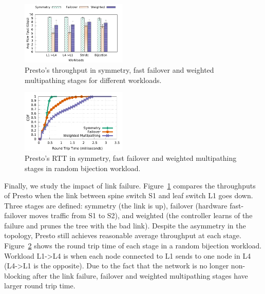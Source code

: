 
\begin{figure}[t]
        \centering
  \includegraphics[width=0.45\textwidth]{./figures/failure_handling/failover_compare_tput_witherrbar.pdf}
        \caption{Presto's throughput in symmetry, fast failover and weighted multipathing stages for different workloads.}
        \label{failover_compare_tput}
\end{figure}

\begin{figure}[t]
        \centering
  \includegraphics[width=0.45\textwidth]{./figures/failure_handling/failover_compare_sockperf_bijection_mice.pdf}
        \caption{Presto's RTT in symmetry, fast failover and weighted multipathing stages in  random bijection workload.}
        \label{failover_compare_sockperf_bijection}
\end{figure}

Finally, we study the impact of link failure.
Figure~\ref{failover_compare_tput} compares the throughputs of
Presto when %
the link between spine switch S1 and leaf switch L1 goes down.
Three stages are defined: symmetry (the link is up), failover (hardware fast-failover moves traffic from S1 to S2), and weighted (the controller
learns of the failure and prunes the tree with the bad link).
Despite the asymmetry in the topology, Presto still achieves reasonable average throughput at 
each stage.
Figure~\ref{failover_compare_sockperf_bijection} shows the round trip time of
each stage in a random bijection workload. 
Workload L1->L4 is when each node connected to L1 sends to one node in L4 (L4->L1 is the opposite).
Due to the fact that the network is no longer non-blocking after the link failure,
failover and weighted multipathing stages have larger round trip time.



